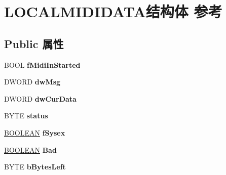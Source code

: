 \hypertarget{struct_l_o_c_a_l_m_i_d_i_d_a_t_a}{}\section{L\+O\+C\+A\+L\+M\+I\+D\+I\+D\+A\+T\+A结构体 参考}
\label{struct_l_o_c_a_l_m_i_d_i_d_a_t_a}
\subsection*{Public 属性}
\begin{DoxyCompactItemize}
\item 
\mbox{\label{struct_l_o_c_a_l_m_i_d_i_d_a_t_a_a0259885160a21b26fe502bc81c3eef7a}} 
B\+O\+OL {\bfseries f\+Midi\+In\+Started}
\item 
\mbox{\label{struct_l_o_c_a_l_m_i_d_i_d_a_t_a_a02645b560c6da768dd254c1b12902862}} 
D\+W\+O\+RD {\bfseries dw\+Msg}
\item 
\mbox{\label{struct_l_o_c_a_l_m_i_d_i_d_a_t_a_a90502c0c137a62cc78766e72cdc3387c}} 
D\+W\+O\+RD {\bfseries dw\+Cur\+Data}
\item 
\mbox{\label{struct_l_o_c_a_l_m_i_d_i_d_a_t_a_a00169af88b7074ab5ff15e4138ea7c2a}} 
B\+Y\+TE {\bfseries status}
\item 
\mbox{\label{struct_l_o_c_a_l_m_i_d_i_d_a_t_a_a2bb3ae6febeabed4b876c5868a2d9c9a}} 
\hyperlink{_processor_bind_8h_a112e3146cb38b6ee95e64d85842e380a}{B\+O\+O\+L\+E\+AN} {\bfseries f\+Sysex}
\item 
\mbox{\label{struct_l_o_c_a_l_m_i_d_i_d_a_t_a_aad000738eb4c489b3f2520e1555276b8}} 
\hyperlink{_processor_bind_8h_a112e3146cb38b6ee95e64d85842e380a}{B\+O\+O\+L\+E\+AN} {\bfseries Bad}
\item 
\mbox{\label{struct_l_o_c_a_l_m_i_d_i_d_a_t_a_a322f499979f42c4d526af9d558479a60}} 
B\+Y\+TE {\bfseries b\+Bytes\+Left}
\item 
\mbox{\label{struct_l_o_c_a_l_m_i_d_i_d_a_t_a_a8fefaf7f6fd3d2cd858870afc643e33c}} 

\end{DoxyCompactItemize}
